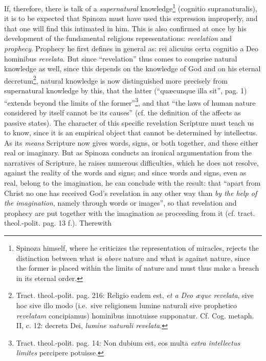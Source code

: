 \documentclass[12pt,a4paper,openany]{book}
\newcommand{\opage}[1]{\marginnote{\footnotesize\textit{[#1]}}}
\begin{document}
If, therefore, there is talk of a \emph{supernatural} knowledge\footnote{Spinoza himself, where he criticizes the representation of miracles, rejects the distinction between what is \emph{above} nature and what is against nature, since the former is placed within the limits of nature and must thus make a breach in its eternal order.} (cognitio supranaturalis), it is to be expected that Spinoza must
\opage{149}\setcounter{footnote}{0}have used this expression improperly, and that one will find this intimated in him. This is also confirmed at once by his development of the fundamental religious representations: \emph{revelation} and \emph{prophecy}. Prophecy he first defines in general as: rei alicuius certa cognitio a Deo hominibus \emph{revelata}. But since ``revelation'' thus comes to comprise natural knowledge as well, since this depends on the knowledge of God and on his eternal decretum\footnote{Tract. theol.-polit. pag. 216: Religio eadem est, \emph{et a Deo æque revelata}, sive hoc sive illo modo (i.e.\ sive religionem lumine naturali sive prophetico \emph{revelatam} concipiamus) hominibus innotuisse supponatur. Cf. Cog. metaph. II, c. 12: decreta Dei, \emph{lumine naturali revelata}.}, natural knowledge is now distinguished more precisely from supernatural knowledge by this, that the latter (``quæcunque illa sit'', pag. 1) ``extends beyond the limits of the former''\footnote{Tract. theol.-polit. pag. 14: Non dubium est, eos multa \emph{extra intellectus limites} percipere potuisse.}, and that ``the laws of human nature considered by itself cannot be its causes'' (cf. the definition of the affects as passive states). The character of this specific revelation Scripture must teach us to know, since it is an empirical object that cannot be determined by intellectus. As its \emph{means} Scripture now gives words, signs, or both together, and these either real or imaginary. But as Spinoza conducts an ironical argumentation from the narratives of Scripture, he raises numerous difficulties, which he does not resolve, against the reality of the words and signs; and since words and signs, even as real, belong to the imagination, he can conclude with the result: that ``apart from Christ no one has received God's revelation in any other way than \emph{by the help of the imagination}, namely through words or images'', so that revelation and prophecy are put together with the imagination as proceeding from it (cf. tract. theol.-polit. pag. 13 f.). Therewith
\end{document}
